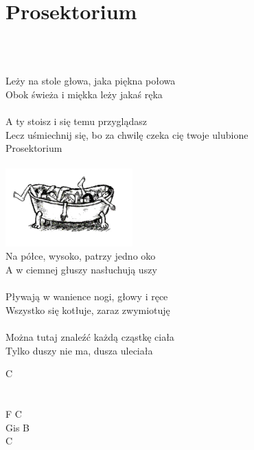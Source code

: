 \documentclass[a5paper, 10pt]{book}
\begin{document}
\section{Prosektorium}\textcolor{lightgray}{\textit{}}\\~\\
\begin{minipage}[t]{0.75\textwidth}
  Leży na stole głowa, jaka piękna połowa\\
  Obok świeża i miękka leży jakaś ręka\\
  \\
  \hspace*{5mm}A ty stoisz i się temu przyglądasz\\
  \hspace*{5mm}Lecz uśmiechnij się, bo za chwilę czeka cię twoje ulubione\\
  \hspace*{5mm}Prosektorium\\
  \\
  \hspace*{7cm}\includegraphics[height=3cm]{images/prosektorium.png}\vspace*{-3.05cm}\\
  Na półce, wysoko, patrzy jedno oko\\
  A w ciemnej głuszy nasłuchują uszy\\
  \\
  Pływają w wanience nogi, głowy i ręce\\
  Wszystko się kotłuje, zaraz zwymiotuję\\
  \\
  Można tutaj znaleźć każdą cząstkę ciała\\
  Tylko duszy nie ma, dusza uleciała\\
\end{minipage}
\begin{minipage}[t]{0.25\textwidth}
  C\\
  \\
  \\
  F C\\
  Gis B\\
  C\\
  \\
\end{minipage}
\end{document}
